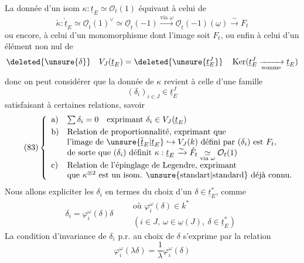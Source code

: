 La donnée d'un isom $\kappa:\underline t_E\simeq\mathcal O_t(1)$ équivaut à celui de
\[
\check\kappa:\check{\underline t}_E\simeq
\underline{\mathcal O}_t(1)^\vee\simeq\underline{\mathcal O}_t(-1)
\xrightarrow{\text{via }\omega}
\underline{\mathcal O}_t(-1)(\underline{\omega})\xrightarrow{\sim}F_t
\]
ou encore, à celui d'un  monomorphisme
dont l'image soit $F_t$, ou enfin à celui d'un élément non nul de
\[
\deleted{\unsure{\delta}}\quad
V_J(\underline t_E)=\deleted{\unsure{\underline t_E^J}}\quad
\operatorname{Ker}(\underline t_E^J\xrightarrow[\text{somme}]{}\underline t_E)
\]
donc on peut considérer que la donnée de $\kappa$ revient à celle d'une famille
\[
\tag{82}
(\delta_i)_{i\in J}\in\underline t_E^J
\]
satisfaisant à certaines relations, savoir
\[
\tag{83}
\left\{\begin{array}{ll}
\text{a)}&\sum\delta_i=0\quad\text{exprimant }\delta_i\in V_J(\underline t_E)\\[3pt]
\text{b)}&\text{Relation de proportionnalité, exprimant que}\\
&\text{l'image de }\unsure{\check{\underline t}_E|\underline t_E}\hookrightarrow V_J(k)\text{ défini par }(\delta_i)\text{ est }F_t,\\
&\text{de sorte que }(\delta_i)\text{ définit }
\kappa:\underline t_E\xrightarrow{\sim}\check F_t
\underset{\text{via }\omega}{\simeq}\mathcal O_t(1)\\[3pt]
\text{c)}&\text{Relation de l'épinglage de Legendre, exprimant}\\
&\text{que }\kappa^{\otimes2}\text{ est un isom. }\unsure{\text{standart}|\text{standard}}\text{ déjà connu.}
\end{array}\right.
\]
Nous allons expliciter les $\delta_i$ en termes du choix d'un $\delta\in\underline t_E^*$,  comme
\[
\tag{84}
\delta_i=\varphi_i^\omega(\delta)\delta
\qquad
\begin{gathered}
\text{où }\varphi_i^\omega(\delta)\in k^*\\
(i\in J,\ \omega\in\underline\omega(J),\ \delta\in\underline t_E^*)
\end{gathered}
\]
La condition d'invariance de $\delta_i$ p.r. au choix de $\delta$ s'exprime par la relation
\[
\tag{85}
\varphi_i^\omega(\lambda\delta)=\frac1\lambda\varphi_i^\omega(\delta)
\]

